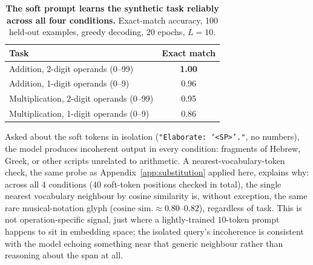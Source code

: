 \documentclass{article}
\newcommand{\best}[1]{\textbf{#1}}
\begin{document}
\begin{table}[h]
  \centering
  \caption{\textbf{The soft prompt learns the synthetic task reliably across all four conditions.}
    Exact-match accuracy, 100 held-out examples, greedy decoding, 20 epochs, $L{=}10$.}
  \label{tab:synth_arith}
  \small
  \setlength{\tabcolsep}{8pt}
  \begin{tabular}{lc}
    \toprule
    Task & Exact match \\
    \midrule
    Addition, 2-digit operands (0--99)       & \best{1.00} \\
    Addition, 1-digit operands (0--9)        & 0.96 \\
    Multiplication, 2-digit operands (0--99) & 0.95 \\
    Multiplication, 1-digit operands (0--9)  & 0.86 \\
    \bottomrule
  \end{tabular}
\end{table}

Asked about the soft tokens in isolation (\texttt{"Elaborate: `<SP>'."}, no numbers), the model produces incoherent output in every condition: fragments of Hebrew, Greek, or other scripts unrelated to arithmetic.
A nearest-vocabulary-token check, the same probe as Appendix~\ref{app:substitution} applied here, explains why: across all 4 conditions ($40$ soft-token positions checked in total), the single nearest vocabulary neighbour by cosine similarity is, without exception, the same rare musical-notation glyph ($\text{cosine sim.} \approx 0.80$--$0.82$), regardless of task.
This is not operation-specific signal, just where a lightly-trained $10$-token prompt happens to sit in embedding space; the isolated query's incoherence is consistent with the model echoing something near that generic neighbour rather than reasoning about the span at all.
\end{document}
